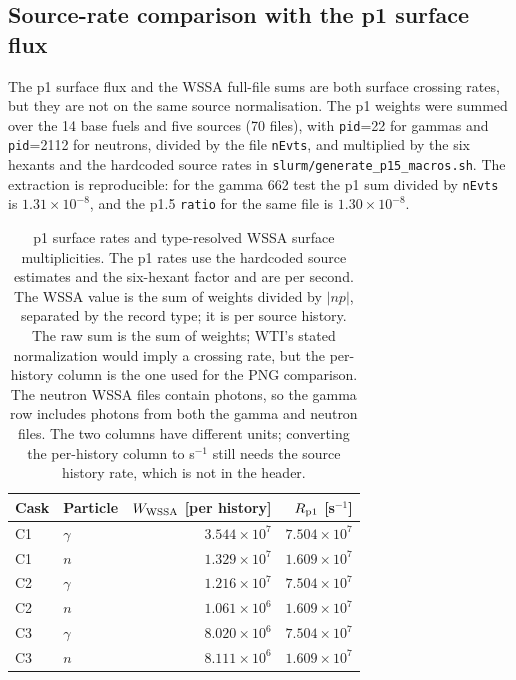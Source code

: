 \documentclass[11pt,a4paper]{article}
\begin{document}
\subsection{Source-rate comparison with the p1 surface flux}

The p1 surface flux and the WSSA full-file sums are both surface crossing
rates, but they are not on the same source normalisation.  The p1 weights were
summed over the 14 base fuels and five sources (70 files), with
\texttt{pid}=22 for gammas and \texttt{pid}=2112 for neutrons, divided by the
file \texttt{nEvts}, and multiplied by the six hexants and the hardcoded
source rates in \texttt{slurm/generate\_p15\_macros.sh}.  The extraction is
reproducible: for the gamma 662 test the p1 sum divided by \texttt{nEvts} is
$1.31\times10^{-8}$, and the p1.5 \texttt{ratio} for the same file is
$1.30\times10^{-8}$.

\begin{table}[t]
\centering
\caption{p1 surface rates and type-resolved WSSA surface multiplicities.  The
p1 rates use the hardcoded source estimates and the six-hexant factor and are
per second.  The WSSA value is the sum of weights divided by $|np|$, separated
by the record type; it is per source history.  The raw sum is the sum of
weights; WTI's stated normalization would imply a crossing rate, but the
per-history column is the one used for the PNG comparison.  The neutron WSSA files contain photons, so the gamma row includes
photons from both the gamma and neutron files.  The two columns have different
units; converting the per-history column to s$^{-1}$ still needs the source
history rate, which is not in the header.}
\label{tab:p1_wssa}
\footnotesize
\begin{tabular}{@{}l l r r@{}}
\toprule
Cask & Particle & $W_{\rm WSSA}$ [per history] & $R_{\rm p1}$ [s$^{-1}$] \\
\midrule
C1 & $\gamma$ & $3.544\times10^{7}$ & $7.504\times10^{7}$ \\
C1 & $n$      & $1.329\times10^{7}$ & $1.609\times10^{7}$ \\
C2 & $\gamma$ & $1.216\times10^{7}$ & $7.504\times10^{7}$ \\
C2 & $n$      & $1.061\times10^{6}$ & $1.609\times10^{7}$ \\
C3 & $\gamma$ & $8.020\times10^{6}$ & $7.504\times10^{7}$ \\
C3 & $n$      & $8.111\times10^{6}$ & $1.609\times10^{7}$ \\
\bottomrule
\end{tabular}
\end{table}
\end{document}
